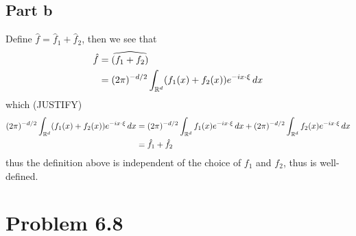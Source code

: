 \documentclass[12pt]{report}
\begin{document}
\subsection*{Part b}
Define $\hat{f} = \hat{f}_1 + \hat{f}_2$, then we see that
\begin{align*}
    \hat{f} &= \widehat{(f_1 + f_2)} \\
            &= (2\pi)^{-d/2} \int_{\mathbb{R}^d} (f_1(x) + f_2(x)) e^{-ix \cdot \xi}\, dx \\
\end{align*}
which (JUSTIFY)
\begin{align*}
    (2\pi)^{-d/2} \int_{\mathbb{R}^d} (f_1(x) + f_2(x)) e^{-ix \cdot \xi}\, dx &= (2\pi)^{-d/2} \int_{\mathbb{R}^d} f_1(x) e^{-ix \cdot \xi}\, dx + (2\pi)^{-d/2} \int_{\mathbb{R}^d} f_2(x) e^{-ix \cdot \xi}\, dx \\
    &= \hat{f}_1 + \hat{f}_2
\end{align*}
thus the definition above is independent of the choice of $f_1$ and $f_2$, thus is well-defined.

\section*{Problem 6.8}
\end{document}
